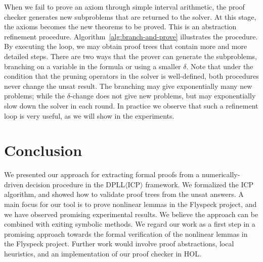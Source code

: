 \documentclass{llncs}
\begin{document}
When we fail to prove an axiom through simple interval arithmetic, the
proof checker generates new subproblems that are returned to the
solver. At this stage, the axioms becomes the new theorems to be
proved. This is an abstraction refinement procedure.
Algorithm~\ref{alg:branch-and-prove} illustrates the procedure. By
executing the loop, we may obtain proof trees that contain more and more
detailed steps. There are two ways that the prover can generate the
subproblems, branching on a variable in the formula or using a smaller
$\delta$. Note that under the condition that the pruning operators in
the solver is well-defined, both procedures never change the {\sf
  unsat} result. The branching may give exponentially many new
problems; while the $\delta$-change does not give new problems, but
may exponentially slow down the solver in each round. In practice we
observe that such a refinement loop is very useful, as we will show in
the experiments.




\section{Conclusion}

We presented our approach for extracting formal proofs from a numerically-driven
decision procedure in the DPLL$\langle$ICP$\rangle$ framework. We formalized the ICP algorithm, and showed how to validate proof trees from the unsat answers.  A main focus for our tool is to prove
nonlinear lemmas in the Flyspeck project, and we have observed promising
experimental results. We believe the approach can be combined with exiting
symbolic methods. We regard our work as a first step in a promising approach towards the formal
verification of the nonlinear lemmas in the Flyspeck project. Further work
would involve proof abstractions, local heuristics, and an implementation of our proof checker in HOL.




% 
\end{document}
